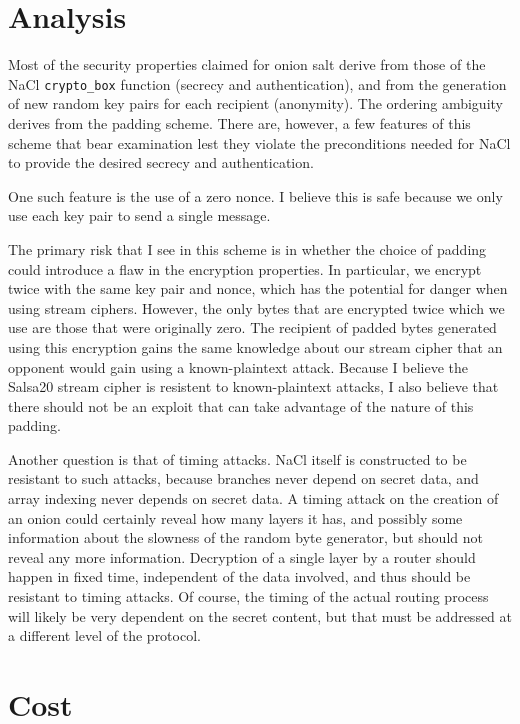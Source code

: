 \documentclass[letterpaper,twocolumn,amsmath,amssymb,pre,aps,10pt]{revtex4-1}
\begin{document}
\section{Analysis}

Most of the security properties claimed for onion salt derive from
those of the NaCl \texttt{crypto\_box} function (secrecy and
authentication), and from the generation of new random key pairs for
each recipient (anonymity).  The ordering ambiguity derives from the
padding scheme.  There are, however, a few features of this scheme
that bear examination lest they violate the preconditions needed for
NaCl to provide the desired secrecy and authentication.

One such feature is the use of a zero nonce.  I believe this is safe
because we only use each key pair to send a single message.

The primary risk that I see in this scheme is in whether the choice of
padding could introduce a flaw in the encryption properties.  In
particular, we encrypt twice with the same key pair and nonce, which
has the potential for danger when using stream ciphers.  However, the
only bytes that are encrypted twice which we use are those that were
originally zero.  The recipient of padded bytes generated using this
encryption gains the same knowledge about our stream cipher that an
opponent would gain using a known-plaintext attack.  Because I believe
the Salsa20 stream cipher is resistent to known-plaintext attacks, I
also believe that there should not be an exploit that can take
advantage of the nature of this padding.

Another question is that of timing attacks.  NaCl itself is
constructed to be resistant to such attacks, because branches never
depend on secret data, and array indexing never depends on secret
data.  A timing attack on the creation of an onion could certainly
reveal how many layers it has, and possibly some information about the
slowness of the random byte generator, but should not reveal any more
information.  Decryption of a single layer by a router should happen
in fixed time, independent of the data involved, and thus should be
resistant to timing attacks.  Of course, the timing of the actual
routing process will likely be very dependent on the secret content,
but that must be addressed at a different level of the protocol.

\section{Cost}
\end{document}
